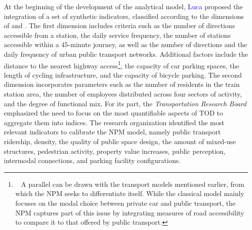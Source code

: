 \begin{refsegment}
At the beginning of the development of the analytical model, \textcolor{blue}{Luca} \textcolor{blue}{\textcite[202-203]{bertolini_spatial_1999}} proposed the integration of a set of synthetic indicators, classified according to the dimensions of  and . The first dimension includes criteria such as the number of directions accessible from a station, the daily service frequency, the number of stations accessible within a 45-minute journey, as well as the number of directions and the daily frequency of urban public transport networks. Additional factors include the distance to the nearest highway access\footnote{~
    A parallel can be drawn with the transport models mentioned earlier, from which the \acrshort{NPM} seeks to differentiate itself. While the classical model mainly focuses on the modal choice between private car and public transport, the \acrshort{NPM} captures part of this issue by integrating measures of road accessibility to compare it to that offered by public transport.
}, the capacity of car parking spaces, the length of cycling infrastructure, and the capacity of bicycle parking. The second dimension incorporates parameters such as the number of residents in the train station area, the number of employees distributed across four sectors of activity, and the degree of functional mix. For its part, the \textsl{Transportation Research Board} emphasized the need to focus on the most quantifiable aspects of \acrshort{TOD} to aggregate them into indices. The research organization \textcolor{blue}{\textcite{transportation_research_board_of_the_national_academies_transit_2007}} identified the most relevant indicators to calibrate the \acrshort{NPM} model, namely public transport ridership, density, the quality of public space design, the amount of mixed-use structures, pedestrian activity, property value increases, public perception, intermodal connections, and parking facility configurations.%


\end{refsegment}
